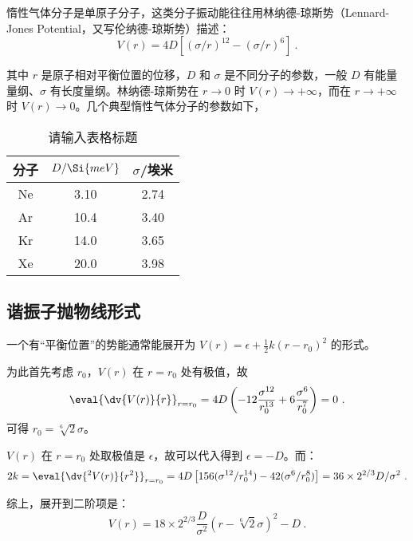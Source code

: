 
惰性气体分子是单原子分子，这类分子振动能往往用林纳德-琼斯势（Lennard-Jones Potential，又写伦纳德-琼斯势）描述：
\begin{equation}
V(r) = 4 D\left[(\sigma / r)^{12} - (\sigma/r)^6\right] ~.
\end{equation}

其中 $r$ 是原子相对平衡位置的位移，$D$ 和 $\sigma$ 是不同分子的参数，一般 $D$ 有能量量纲、$\sigma$ 有长度量纲。林纳德-琼斯势在 $r \rightarrow 0$ 时 $V(r) \rightarrow +\infty$，而在 $r \rightarrow +\infty$ 时 $V(r) \rightarrow 0$。几个典型惰性气体分子的参数如下，
\begin{table}[ht]
\centering
\caption{请输入表格标题}\label{tab_LenJoP1}
\begin{tabular}{|c|c|c|}
\hline
分子 & $D/\Si{meV}$ & $\sigma$/埃米 \\
\hline
Ne & 3.10 & 2.74 \\
\hline
Ar & 10.4 & 3.40 \\
\hline
Kr & 14.0 & 3.65 \\
\hline
Xe & 20.0 & 3.98 \\
\hline
\end{tabular}
\end{table}


\subsection{谐振子抛物线形式}
一个有“平衡位置”的势能通常能展开为 $V(r) = \epsilon + \frac{1}2 k (r-r_0)^2$ 的形式。

为此首先考虑 $r_0$，$V(r)$ 在 $r=r_0$ 处有极值，故
$$\eval{\dv{V(r)}{r}} _{r=r_0} = 4D\left(-12 \frac{\sigma^{12}}{r_0 ^{13}} + 6 \frac{\sigma^6}{r_0^7}\right) = 0~.$$
可得 $r_0 = \sqrt[6]{2} \sigma$。

$V(r)$ 在 $r=r_0$ 处取极值是 $\epsilon$，故可以代入得到 $\epsilon = -D$。而：
$$2 k = \eval{\dv{^2 V(r)}{r^2}}_{r=r_0} = 4 D \left[156 (\sigma^{12} / r_0^{14}) - 42 (\sigma^{6}/r_0^{8})\right] = 36 \times 2^{2/3} D/\sigma^2 ~.$$

综上，展开到二阶项是：
\begin{equation}
V(r) = 18 \times 2^{2/3} \frac{D}{\sigma^2} (r - \sqrt[6]{2} \sigma)^2 - D ~.
\end{equation}
